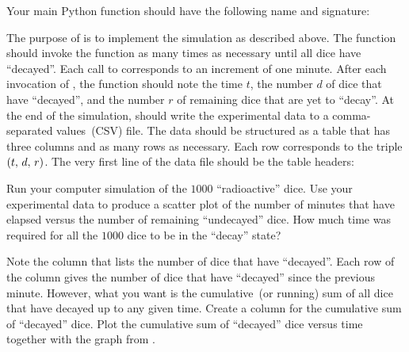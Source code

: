 \documentclass[a4paper,oneside,12pt]{article}
\begin{document}
\begin{problem}
\begin{packedenum}
  \item\label{subprob:radioactive_dice_simulation_main}
    Your main Python function should have the following name and
    signature:
    \begin{center}
    \end{center}
    The purpose of  is to implement the simulation as
    described above.  The function  should invoke the
    function  as many times as necessary until all
    dice have ``decayed''.  Each call to 
    corresponds to an increment of one minute.  After each invocation
    of , the function  should note the
    time $t$, the number $d$ of dice that have ``decayed'', and the
    number $r$ of remaining dice that are yet to ``decay''.  At the
    end of the simulation,  should write the experimental
    data to a comma-separated values~(CSV) file.  The data should be
    structured as a table that has three columns and as many rows as
    necessary.  Each row corresponds to the triple
    $({t},\, {d},\, {r})$.  The very first line of the data file should
    be the table headers:
    \begin{center}
    \end{center}

  \item\label{subprob:radioactive_dice_graph_remaining}
    Run your computer simulation of the $1000$ ``radioactive'' dice.
    Use your experimental data to produce a scatter plot of the number
    of minutes that have elapsed versus the number of remaining
    ``undecayed'' dice.  How much time was required for all the $1000$
    dice to be in the ``decay'' state?

  \item\label{subprob:radioactive_dice_cumulative_decayed}
    Note the column that lists the number of dice that have
    ``decayed''.   Each row of the column gives the number of dice
    that have ``decayed'' since the previous minute.  However, what
    you want is the cumulative~(or running) sum of all dice that have
    decayed up to any given time.  Create a column for the cumulative
    sum of ``decayed'' dice.  Plot the cumulative sum of ``decayed''
    dice versus time together with the graph
    from .


\end{packedenum}
\end{problem}
\end{document}
